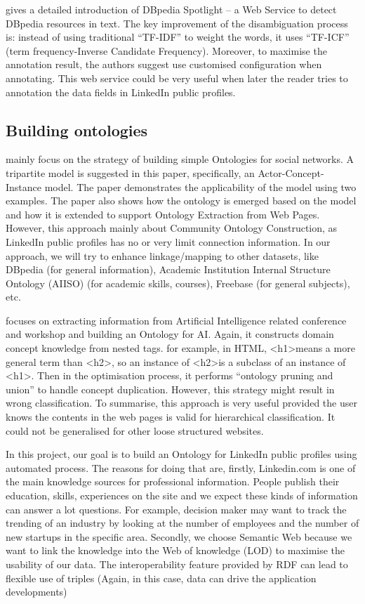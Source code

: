 \cite{mendes2011} gives a detailed introduction of DBpedia Spotlight -- a Web Service to detect DBpedia resources in text. The key improvement of the disambiguation process is: instead of using traditional ``TF-IDF'' to weight the words, it uses ``TF-ICF'' (term frequency-Inverse Candidate Frequency). Moreover, to maximise the annotation result, the authors suggest use customised configuration when annotating. This web service could be very useful when later the reader tries to annotation the data fields in LinkedIn public profiles.

\subsection{Building ontologies}

\cite{mika2007} mainly focus on the strategy of building simple Ontologies for social networks. A tripartite model is suggested in this paper, specifically, an Actor-Concept-Instance model. The paper demonstrates the applicability of the model using two examples. The paper also shows how the ontology is emerged based on the model and how it is extended to support Ontology Extraction from Web Pages. However, this approach mainly about Community Ontology Construction, as LinkedIn public profiles has no or very limit connection information. In our approach, we will try to enhance linkage/mapping to other datasets, like DBpedia (for general information), Academic Institution Internal Structure Ontology (AIISO) (for academic skills, courses), Freebase (for general subjects), etc.

\cite{wang2011} focuses on extracting information from Artificial Intelligence related conference and workshop and building an Ontology for AI. Again, it constructs domain concept knowledge from nested tags. for example, in HTML, \textless h1\textgreater means a more general term than \textless h2\textgreater, so an instance of \textless h2\textgreater is a subclass of an instance of \textless h1\textgreater. Then in the optimisation process, it performs ``ontology pruning and union'' to handle concept duplication. However, this strategy might result in wrong classification. To summarise, this approach is very useful provided the user knows the contents in the web pages is valid for hierarchical classification. It could not be generalised for other loose structured websites.

In this project, our goal is to build an Ontology for LinkedIn public profiles using automated process. The reasons for doing that are, firstly, Linkedin.com is one of the main knowledge sources for professional information. People publish their education, skills, experiences on the site and we expect these kinds of information can answer a lot questions. For example, decision maker may want to track the trending of an industry by looking at the number of employees and the number of new startups in the specific area. Secondly, we choose Semantic Web because we want to link the knowledge into the Web of knowledge (LOD) to maximise the usability of our data.  The interoperability feature provided by RDF can lead to flexible use of triples (Again, in this case, data can drive the application developments)


